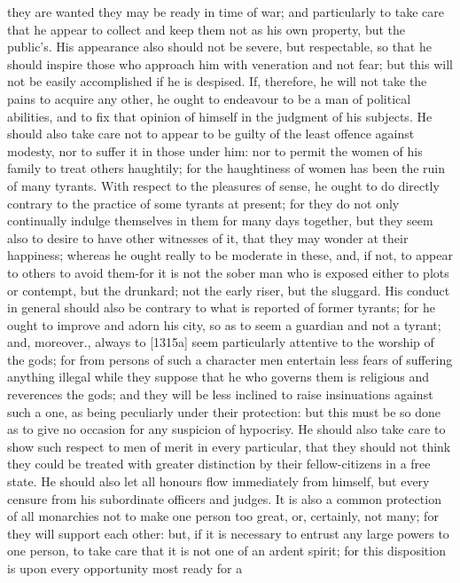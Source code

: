 they are wanted they may be ready in time of war; and particularly to take
care that he appear to collect and keep them not as his own property, but
the public's. His appearance also should not be severe, but respectable,
so that he should inspire those who approach him with veneration and not
fear; but this will not be easily accomplished if he is despised. If,
therefore, he will not take the pains to acquire any other, he ought to
endeavour to be a man of political abilities, and to fix that opinion of
himself in the judgment of his subjects. He should also take care not to
appear to be guilty of the least offence against modesty, nor to suffer it
in those under him: nor to permit the women of his family to treat others
haughtily; for the haughtiness of women has been the ruin of many tyrants.
With respect to the pleasures of sense, he ought to do directly contrary
to the practice of some tyrants at present; for they do not only
continually indulge themselves in them for many days together, but they
seem also to desire to have other witnesses of it, that they may wonder at
their happiness; whereas he ought really to be moderate in these, and, if
not, to appear to others to avoid them-for it is not the sober man who is
exposed either to plots or contempt, but the drunkard; not the early
riser, but the sluggard. His conduct in general should also be contrary to
what is reported of former tyrants; for he ought to improve and adorn his
city, so as to seem a guardian and not a tyrant; and, moreover., always to
[1315a] seem particularly attentive to the worship of the gods; for from
persons of such a character men entertain less fears of suffering anything
illegal while they suppose that he who governs them is religious and
reverences the gods; and they will be less inclined to raise insinuations
against such a one, as being peculiarly under their protection: but this
must be so done as to give no occasion for any suspicion of hypocrisy. He
should also take care to show such respect to men of merit in every
particular, that they should not think they could be treated with greater
distinction by their fellow-citizens in a free state. He should also let
all honours flow immediately from himself, but every censure from his
subordinate officers and judges. It is also a common protection of all
monarchies not to make one person too great, or, certainly, not many; for
they will support each other: but, if it is necessary to entrust any large
powers to one person, to take care that it is not one of an ardent spirit;
for this disposition is upon every opportunity most ready for a
